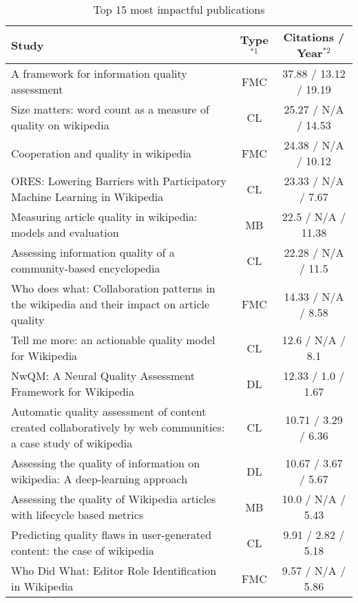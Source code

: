 \begin{table}[htbp]
    \caption{Top 15 most impactful publications}
    \label{tab:impactful}
    \centering
    \begin{tabular}{m{} c c}
        \toprule
        \textbf{Study} & \textbf{Type}$^{*1}$ & \textbf{Citations / Year}$^{*2}$ \\
        \midrule
        A framework for information quality assessment~\cite{Stvilia2007_lr1012} & FMC & 37.88 / 13.12 / 19.19 \\
        Size matters: word count as a measure of quality on wikipedia~\cite{Blumenstock2008_lr4} & CL & 25.27 / N/A / 14.53 \\
        Cooperation and quality in wikipedia~\cite{Wilkinson2007_lr2} & FMC & 24.38 / N/A / 10.12 \\
        ORES: Lowering Barriers with Participatory Machine Learning in Wikipedia~\cite{Halfaker2020_lr1055} & CL & 23.33 / N/A / 7.67 \\
        Measuring article quality in wikipedia: models and evaluation~\cite{Hu2007_lr1} & MB & 22.5 / N/A / 11.38 \\
        Assessing information quality of a community-based encyclopedia~\cite{Stvilia2005_lr1013} & CL & 22.28 / N/A / 11.5 \\
        Who does what: Collaboration patterns in the wikipedia and their impact on article quality~\cite{Liu2011_lr3} & FMC & 14.33 / N/A / 8.58 \\
        Tell me more: an actionable quality model for Wikipedia~\cite{Warncke-Wang2013_lr13} & CL & 12.6 / N/A / 8.1 \\
        NwQM: A Neural Quality Assessment Framework for Wikipedia~\cite{Guda2020_lr38} & DL & 12.33 / 1.0 / 1.67 \\
        Automatic quality assessment of content created collaboratively by web communities: a case study of wikipedia~\cite{Dalip2009_lr14} & CL & 10.71 / 3.29 / 6.36 \\
        Assessing the quality of information on wikipedia: A deep‐learning approach~\cite{Wang2020_lr26} & DL & 10.67 / 3.67 / 5.67 \\
        Assessing the quality of Wikipedia articles with lifecycle based metrics~\cite{Wohner2009_lr10} & MB & 10.0 / N/A / 5.43 \\
        Predicting quality flaws in user-generated content: the case of wikipedia~\cite{Anderka2012_lr17} & CL & 9.91 / 2.82 / 5.18 \\
        Who Did What: Editor Role Identification in Wikipedia~\cite{Yang2016_lr2001} & FMC & 9.57 / N/A / 5.86 \\

\end{tabular}
\end{table}
